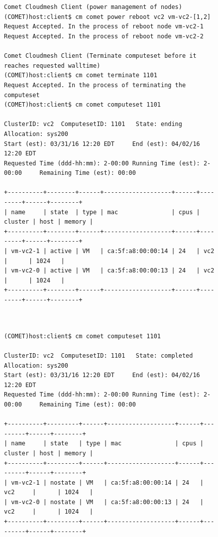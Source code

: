 \begin{figure}[htb] 
\begin{small}
\begin{verbatim}


Comet Cloudmesh Client (power management of nodes)
(COMET)host:client$ cm comet power reboot vc2 vm-vc2-[1,2]
Request Accepted. In the process of reboot node vm-vc2-1
Request Accepted. In the process of reboot node vm-vc2-2

Comet Cloudmesh Client (Terminate computeset before it reaches requested walltime)
(COMET)host:client$ cm comet terminate 1101
Request Accepted. In the process of terminating the computeset
(COMET)host:client$ cm comet computeset 1101

ClusterID: vc2	ComputesetID: 1101	 State: ending		Allocation: sys200
Start (est): 03/31/16 12:20 EDT		End (est): 04/02/16 12:20 EDT
Requested Time (ddd-hh:mm): 2-00:00	Running Time (est): 2-00:00		Remaining Time (est): 00:00

+----------+--------+------+-------------------+------+---------+------+--------+
| name     | state  | type | mac               | cpus | cluster | host | memory |
+----------+--------+------+-------------------+------+---------+------+--------+
| vm-vc2-1 | active | VM   | ca:5f:a8:00:00:14 | 24   | vc2     |      | 1024   |
| vm-vc2-0 | active | VM   | ca:5f:a8:00:00:13 | 24   | vc2     |      | 1024   |
+----------+--------+------+-------------------+------+---------+------+--------+
\end{verbatim}
\end{small}
\end{figure}

\begin{figure}[htb] 
\begin{small}
\begin{verbatim}


(COMET)host:client$ cm comet computeset 1101

ClusterID: vc2	ComputesetID: 1101	 State: completed		Allocation: sys200
Start (est): 03/31/16 12:20 EDT		End (est): 04/02/16 12:20 EDT
Requested Time (ddd-hh:mm): 2-00:00	Running Time (est): 2-00:00		Remaining Time (est): 00:00

+----------+---------+------+-------------------+------+---------+------+--------+
| name     | state   | type | mac               | cpus | cluster | host | memory |
+----------+---------+------+-------------------+------+---------+------+--------+
| vm-vc2-1 | nostate | VM   | ca:5f:a8:00:00:14 | 24   | vc2     |      | 1024   |
| vm-vc2-0 | nostate | VM   | ca:5f:a8:00:00:13 | 24   | vc2     |      | 1024   |
+----------+---------+------+-------------------+------+---------+------+--------+
\end{verbatim}
\end{small}
\end{figure}

